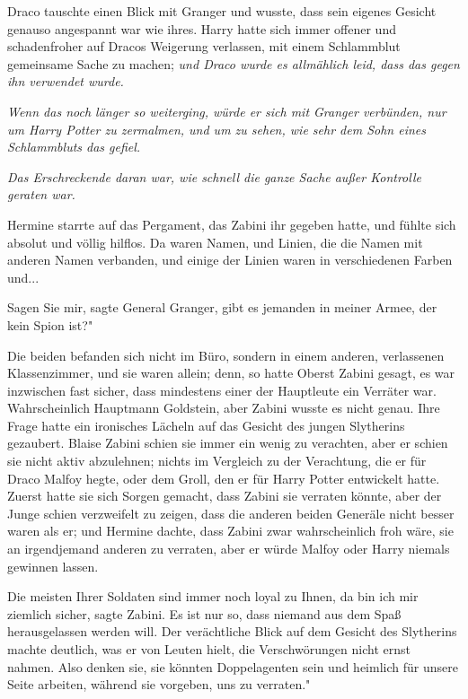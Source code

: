 Draco tauschte einen Blick mit Granger und wusste, dass sein eigenes Gesicht
genauso angespannt war wie ihres. Harry hatte sich immer offener und
schadenfroher auf Dracos Weigerung verlassen, mit einem Schlammblut gemeinsame
Sache zu machen; \emph{und Draco wurde es allmählich leid, dass das gegen ihn
verwendet wurde.}

\emph{Wenn das noch länger so weiterging, würde er sich mit Granger verbünden,
nur um Harry Potter zu zermalmen, und um zu sehen, wie sehr dem Sohn eines
Schlammbluts das gefiel.}

\emph{Das Erschreckende daran war, wie schnell die ganze Sache außer Kontrolle
geraten war.}

Hermine starrte auf das Pergament, das Zabini ihr gegeben hatte, und fühlte sich
absolut und völlig hilflos. Da waren Namen, und Linien, die die Namen mit
anderen Namen verbanden, und einige der Linien waren in verschiedenen Farben
und...

\glqq Sagen Sie mir\grqq{}, sagte General Granger, \glqq gibt es jemanden in
meiner Armee, der kein Spion ist?"

Die beiden befanden sich nicht im Büro, sondern in einem anderen, verlassenen
Klassenzimmer, und sie waren allein; denn, so hatte Oberst Zabini gesagt, es war
inzwischen fast sicher, dass mindestens einer der Hauptleute ein Verräter war.
Wahrscheinlich Hauptmann Goldstein, aber Zabini wusste es nicht genau. Ihre
Frage hatte ein ironisches Lächeln auf das Gesicht des jungen Slytherins
gezaubert. Blaise Zabini schien sie immer ein wenig zu verachten, aber er schien
sie nicht aktiv abzulehnen; nichts im Vergleich zu der Verachtung, die er für
Draco Malfoy hegte, oder dem Groll, den er für Harry Potter entwickelt hatte.
Zuerst hatte sie sich Sorgen gemacht, dass Zabini sie verraten könnte, aber der
Junge schien verzweifelt zu zeigen, dass die anderen beiden Generäle nicht
besser waren als er; und Hermine dachte, dass Zabini zwar wahrscheinlich froh
wäre, sie an irgendjemand anderen zu verraten, aber er würde Malfoy oder Harry
niemals gewinnen lassen.

\glqq Die meisten Ihrer Soldaten sind immer noch loyal zu Ihnen, da bin ich mir
ziemlich sicher\grqq{}, sagte Zabini. \glqq Es ist nur so, dass niemand aus dem
Spaß herausgelassen werden will.\grqq{} Der verächtliche Blick auf dem Gesicht
des Slytherins machte deutlich, was er von Leuten hielt, die Verschwörungen
nicht ernst nahmen. \glqq Also denken sie, sie könnten Doppelagenten sein und
heimlich für unsere Seite arbeiten, während sie vorgeben, uns zu verraten."

